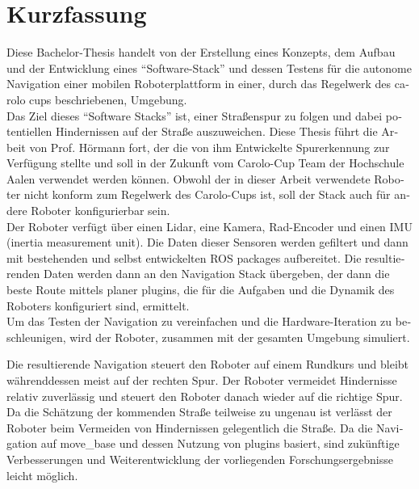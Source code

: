 \chapter*{Kurzfassung}
\label{kurzfassung}

\begin{otherlanguage}{ngerman}

Diese Bachelor-Thesis handelt von der Erstellung eines Konzepts, dem Aufbau und der Entwicklung eines ``Software-Stack'' und dessen Testens für die autonome Navigation einer mobilen Roboterplattform in einer, durch das Regelwerk des carolo cups beschriebenen, Umgebung.\\

Das Ziel dieses ``Software Stacks'' ist, einer Straßenspur zu folgen und dabei potentiellen Hindernissen auf der Straße auszuweichen. Diese Thesis führt die Arbeit von Prof. Hörmann fort, der die von ihm Entwickelte Spurerkennung zur Verfügung stellte und soll in der Zukunft vom Carolo-Cup Team der Hochschule Aalen verwendet werden können. Obwohl der in dieser Arbeit verwendete Roboter nicht konform zum Regelwerk des Carolo-Cups ist, soll der Stack auch für andere Roboter konfigurierbar sein.\\

Der Roboter verfügt über einen Lidar, eine Kamera, Rad-Encoder und einen IMU (inertia measurement unit). Die Daten dieser Sensoren werden gefiltert und dann mit bestehenden und selbst entwickelten ROS packages aufbereitet. Die resultierenden Daten werden dann an den Navigation Stack  übergeben, der dann die beste Route mittels planer plugins, die für die Aufgaben und die Dynamik des Roboters konfiguriert sind, ermittelt.\\

Um das Testen der Navigation zu vereinfachen und die Hardware-Iteration zu beschleunigen, wird der Roboter, zusammen mit der gesamten Umgebung simuliert.

Die resultierende Navigation steuert den Roboter auf einem Rundkurs und bleibt währenddessen meist auf der rechten Spur. Der Roboter vermeidet Hindernisse relativ zuverlässig und steuert den Roboter danach wieder auf die richtige Spur. Da die Schätzung der kommenden Straße teilweise zu ungenau ist verlässt der Roboter beim Vermeiden von Hindernissen gelegentlich die Straße.
Da die Navigation auf move\_base und dessen Nutzung von plugins basiert, sind zukünftige Verbesserungen und Weiterentwicklung der vorliegenden Forschungsergebnisse leicht möglich.

\end{otherlanguage}
